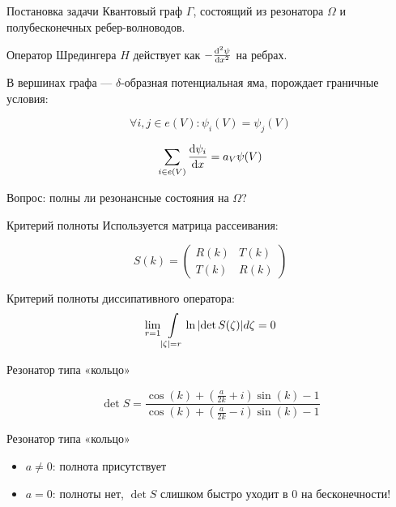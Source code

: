 \documentclass{beamer}
\begin{document}
% 
\begin{frame}{Постановка задачи}
Квантовый граф $\Gamma$, состоящий из резонатора $\Omega$ и полубесконечных ребер-волноводов.

Оператор Шредингера $H$ действует как $-\dv[2]{\psi}{x}$ на ребрах.

В вершинах графа — $\delta$-образная потенциальная яма, порождает граничные условия:

\[
\forall i, j \in e(V): \psi_i(V) = \psi_j(V)
\]

\[
\sum\limits_{i \in e(V)} \dv{\psi_i}{x} (V) = a_V \psi(V)
\]

Вопрос: полны ли резонансные состояния на $\Omega$?
\end{frame}


\begin{frame}{Критерий полноты}
Используется матрица рассеивания:

\[
S(k) = \begin{pmatrix} R(k) & T(k) \\ T(k) & R(k) \end{pmatrix}
\]

Критерий полноты диссипативного оператора:
\[
\lim\limits_{r = 1} \int\limits_{\abs{\zeta} = r} \ln \abs{\det S(\zeta)} d \zeta = 0
\]

\end{frame}


\begin{frame}{Резонатор типа «кольцо»}

\begin{figure}
\begin{tikzpicture}[scale=0.5]

\end{tikzpicture}
\end{figure}

\[
\det S = 
\frac
{\cos\left(k\right) + {\left(\frac{a}{2 k} + i\right)} \sin\left(k\right) - 1}
{\cos\left(k\right) + {\left(\frac{a}{2 k} - i\right)} \sin\left(k\right) - 1}
\]

\end{frame}

\begin{frame}{Резонатор типа «кольцо»}
\begin{itemize}
\item $a \ne 0$: полнота присутствует
\item $a = 0$: полноты нет, $\det S$ слишком быстро уходит в 0 на бесконечности!
\end{itemize}
\end{frame}
\end{document}
